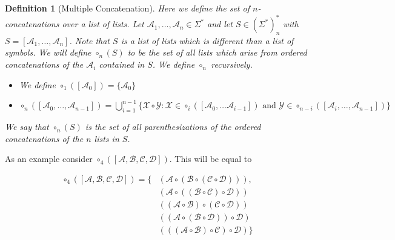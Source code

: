 \documentclass[12pt]{article}
\theoremstyle{break}
\newtheorem{definition}{Definition}[section]
\theoremstyle{break}
\theoremstyle{break}
\theoremstyle{break}
\theoremstyle{break}
\newtheorem{informal definition}[definition]{Informal Definition}
\newcommand{\mc}[1]{\mathcal{#1}}
\begin{document}
\begin{definition}[Multiple Concatenation]
Here we define the set of $n$-concatenations over a list of lists.
Let $\mc{A}_1,\ldots, \mc{A}_n \in \Sigma^*$ and let $S \in (\Sigma^*)^*_n$ with $S = [\mc{A}_1, \ldots, \mc{A}_n]$.
Note that $S$ is a list of lists which is different than a list of symbols.
We will define $\circ_n(S)$ to be the set of all lists which arise from ordered concatenations of the $\mc{A}_i$ contained in $S$.
We define $\circ_n$ recursively.

\begin{itemize}
\item{We define $\circ_1([\mc{A}_0]) = \{\mc{A}_0\}$}
\item{$\circ_n([\mc{A}_0,\ldots, \mc{A}_{n-1}]) = \bigcup_{i=1}^{n-1} \{\mc{X}\circ\mc{Y}:\mc{X} \in \circ_i([\mc{A}_0,\ldots \mc{A}_{i-1}]) \text{ and } \mc{Y}\in \circ_{n-i}([\mc{A}_{i}, \ldots, \mc{A}_{n-1}])\}$}
\end{itemize}
We say that $\circ_n(S)$ is the set of all parenthesizations of the ordered concatenations of the $n$ lists in $S$.

\end{definition}

As an example consider $\circ_4([\mc{A}, \mc{B}, \mc{C}, \mc{D}])$. This will be equal to

\begin{align*}
\circ_4([\mc{A}, \mc{B}, \mc{C}, \mc{D}]) = \big\{& (\mc{A}\circ (\mc{B}\circ(\mc{C}\circ\mc{D}))),\\
& (\mc{A}\circ((\mc{B}\circ\mc{C})\circ\mc{D})) \\
& ((\mc{A}\circ\mc{B})\circ(\mc{C}\circ\mc{D})) \\
& ((\mc{A}\circ(\mc{B}\circ\mc{D}))\circ\mc{D}) \\
& (((\mc{A}\circ\mc{B})\circ\mc{C})\circ\mc{D}) \big\}
\end{align*}

\end{document}
